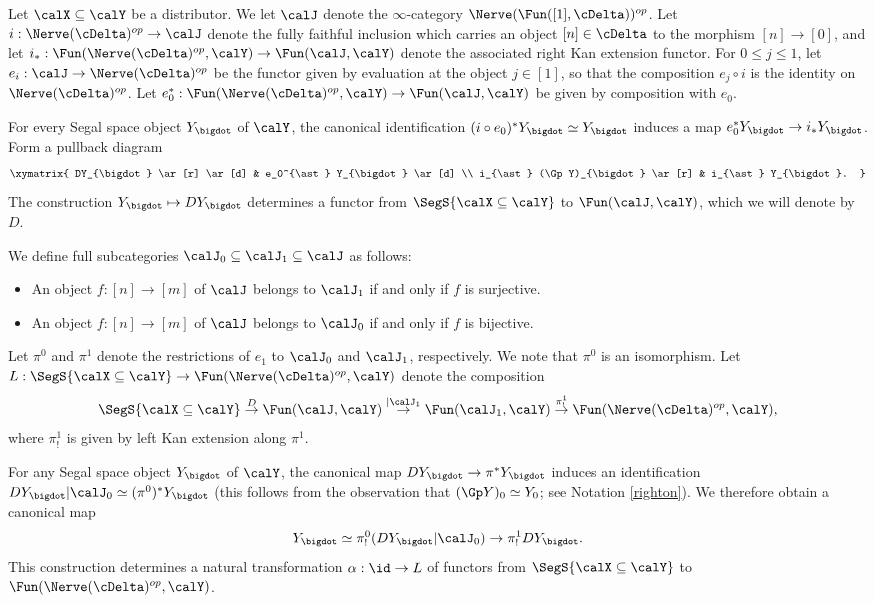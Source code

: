 \begin{construction}\label{tubal}
Let $\calX \subseteq \calY$ be a distributor. We let $\calJ$ denote the $\infty$-category $\Nerve( \Fun( [1], \cDelta) )^{op}$.
Let $i: \Nerve( \cDelta)^{op} \rightarrow \calJ$ denote the fully faithful inclusion which
carries an object $[n] \in \cDelta$ to the morphism $[n] \rightarrow [0]$, and let
$i_{\ast}: \Fun( \Nerve(\cDelta)^{op}, \calY ) \rightarrow \Fun( \calJ, \calY)$ denote the associated right Kan extension functor. For $0 \leq j \leq 1$, let $e_{i}: \calJ \rightarrow \Nerve( \cDelta)^{op}$ be the functor given by evaluation at the object $j \in [1]$, so that the composition $e_{j} \circ i$ is the identity on $\Nerve(\cDelta)^{op}$. Let $e_0^{\ast}: \Fun( \Nerve(\cDelta)^{op}, \calY) \rightarrow \Fun( \calJ, \calY)$ be given by composition
with $e_0$.

For every Segal space object $Y_{\bigdot}$ of $\calY$, the canonical identification
$(i \circ e_0)^{\ast} Y_{\bigdot} \simeq Y_{\bigdot}$ induces a map $e_0^{\ast} Y_{\bigdot} \rightarrow
i_{\ast} Y_{\bigdot}$. Form a pullback diagram
$$ \xymatrix{ DY_{\bigdot} \ar[r] \ar[d] & e_0^{\ast} Y_{\bigdot} \ar[d] \\
i_{\ast} (\Gp Y)_{\bigdot} \ar[r] & i_{\ast} Y_{\bigdot}. }$$
The construction $Y_{\bigdot} \mapsto DY_{\bigdot}$ determines a functor from
$\SegS{ \calX \subseteq \calY}$ to $\Fun( \calJ, \calY)$, which we will denote by $D$. 

We define full subcategories $\calJ_0 \subseteq \calJ_1 \subseteq \calJ$ as follows:
\begin{itemize}
\item An object $f: [n] \rightarrow [m]$ of $\calJ$ belongs to $\calJ_1$ if and only if $f$ is surjective.
\item An object $f: [n] \rightarrow [m]$ of $\calJ$ belongs to $\calJ_0$ if and only if $f$ is bijective.
\end{itemize}
Let $\pi^0$ and $\pi^1$ denote the restrictions of $e_1$ to $\calJ_0$ and $\calJ_1$, respectively. We note that $\pi^0$ is an isomorphism. Let
$L: \SegS{ \calX \subseteq \calY} \rightarrow \Fun( \Nerve(\cDelta)^{op}, \calY)$ denote 
the composition
$$ \SegS{ \calX \subseteq \calY} \stackrel{ D}{\rightarrow} \Fun( \calJ, \calY)
\stackrel{| \calJ_1}{\rightarrow} \Fun( \calJ_1, \calY) \stackrel{ \pi^1_! }{\rightarrow} \Fun(\Nerve(\cDelta)^{op}, \calY),$$ 
where $\pi^1_{!}$ is given by left Kan extension along $\pi^1$.

For any Segal space object $Y_{\bigdot}$ of $\calY$, the canonical map
$DY_{\bigdot} \rightarrow \pi^{\ast} Y_{\bigdot}$ induces an identification
$DY_{\bigdot} | \calJ_0 \simeq (\pi^0)^{\ast} Y_{\bigdot}$ (this follows from the observation that
$(\Gp Y)_{0} \simeq Y_0$; see Notation \ref{righton}). We therefore obtain a canonical map
$$ Y_{\bigdot} \simeq \pi^0_! (DY_{\bigdot} | \calJ_0) \rightarrow \pi^{1}_! DY_{\bigdot}.$$
This construction determines a natural transformation $\alpha: \id \rightarrow L$ of functors from
$\SegS{ \calX \subseteq \calY}$ to $\Fun( \Nerve(\cDelta)^{op}, \calY)$. 
\end{construction}

